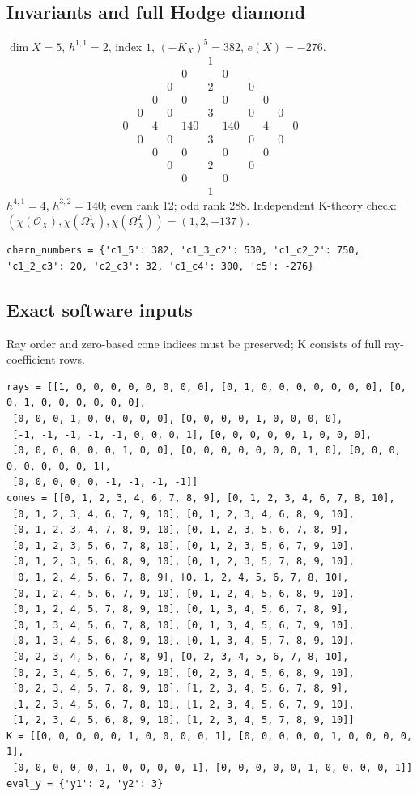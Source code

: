\documentclass[10pt,a4paper]{article}
\begin{document}
\subsection*{Invariants and full Hodge diamond}
$\dim X=5$, $h^{1,1}=2$, index $1$, $(-K_X)^5=382$, $e(X)=-276$.
\[\begin{array}{ccccccccccc}&&&&&1&&&&&\\&&&&0&&0&&&&\\&&&0&&2&&0&&&\\&&0&&0&&0&&0&&\\&0&&0&&3&&0&&0&\\0&&4&&140&&140&&4&&0\\&0&&0&&3&&0&&0&\\&&0&&0&&0&&0&&\\&&&0&&2&&0&&&\\&&&&0&&0&&&&\\&&&&&1&&&&&\end{array}\]
$h^{4,1}=4$, $h^{3,2}=140$; even rank 12; odd rank 288.
Independent K-theory check: $(\chi(\mathcal O_X),\chi(\Omega_X^1),\chi(\Omega_X^2))=(1, 2, -137)$.
\begin{lstlisting}
chern_numbers = {'c1_5': 382, 'c1_3_c2': 530, 'c1_c2_2': 750, 'c1_2_c3': 20, 'c2_c3': 32, 'c1_c4': 300, 'c5': -276}
\end{lstlisting}
\subsection*{Exact software inputs}
Ray order and zero-based cone indices must be preserved; K consists of full ray-coefficient rows.
\begin{lstlisting}
rays = [[1, 0, 0, 0, 0, 0, 0, 0, 0], [0, 1, 0, 0, 0, 0, 0, 0, 0], [0, 0, 1, 0, 0, 0, 0, 0, 0],
 [0, 0, 0, 1, 0, 0, 0, 0, 0], [0, 0, 0, 0, 1, 0, 0, 0, 0],
 [-1, -1, -1, -1, -1, 0, 0, 0, 1], [0, 0, 0, 0, 0, 1, 0, 0, 0],
 [0, 0, 0, 0, 0, 0, 1, 0, 0], [0, 0, 0, 0, 0, 0, 0, 1, 0], [0, 0, 0, 0, 0, 0, 0, 0, 1],
 [0, 0, 0, 0, 0, -1, -1, -1, -1]]
cones = [[0, 1, 2, 3, 4, 6, 7, 8, 9], [0, 1, 2, 3, 4, 6, 7, 8, 10],
 [0, 1, 2, 3, 4, 6, 7, 9, 10], [0, 1, 2, 3, 4, 6, 8, 9, 10],
 [0, 1, 2, 3, 4, 7, 8, 9, 10], [0, 1, 2, 3, 5, 6, 7, 8, 9],
 [0, 1, 2, 3, 5, 6, 7, 8, 10], [0, 1, 2, 3, 5, 6, 7, 9, 10],
 [0, 1, 2, 3, 5, 6, 8, 9, 10], [0, 1, 2, 3, 5, 7, 8, 9, 10],
 [0, 1, 2, 4, 5, 6, 7, 8, 9], [0, 1, 2, 4, 5, 6, 7, 8, 10],
 [0, 1, 2, 4, 5, 6, 7, 9, 10], [0, 1, 2, 4, 5, 6, 8, 9, 10],
 [0, 1, 2, 4, 5, 7, 8, 9, 10], [0, 1, 3, 4, 5, 6, 7, 8, 9],
 [0, 1, 3, 4, 5, 6, 7, 8, 10], [0, 1, 3, 4, 5, 6, 7, 9, 10],
 [0, 1, 3, 4, 5, 6, 8, 9, 10], [0, 1, 3, 4, 5, 7, 8, 9, 10],
 [0, 2, 3, 4, 5, 6, 7, 8, 9], [0, 2, 3, 4, 5, 6, 7, 8, 10],
 [0, 2, 3, 4, 5, 6, 7, 9, 10], [0, 2, 3, 4, 5, 6, 8, 9, 10],
 [0, 2, 3, 4, 5, 7, 8, 9, 10], [1, 2, 3, 4, 5, 6, 7, 8, 9],
 [1, 2, 3, 4, 5, 6, 7, 8, 10], [1, 2, 3, 4, 5, 6, 7, 9, 10],
 [1, 2, 3, 4, 5, 6, 8, 9, 10], [1, 2, 3, 4, 5, 7, 8, 9, 10]]
K = [[0, 0, 0, 0, 0, 1, 0, 0, 0, 0, 1], [0, 0, 0, 0, 0, 1, 0, 0, 0, 0, 1],
 [0, 0, 0, 0, 0, 1, 0, 0, 0, 0, 1], [0, 0, 0, 0, 0, 1, 0, 0, 0, 0, 1]]
eval_y = {'y1': 2, 'y2': 3}
\end{lstlisting}
\end{document}

